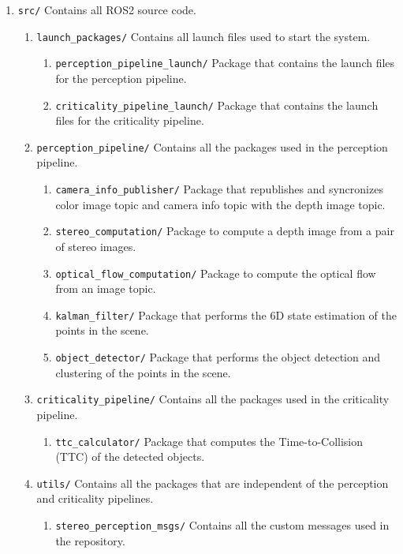 \begin{enumerate}
  \item \texttt{src/} Contains all ROS2 source code.
  \begin{enumerate}
    \item \texttt{launch\_packages/} Contains all launch files used to start the system.
    \begin{enumerate}
      \item \texttt{perception\_pipeline\_launch/} Package that contains the launch files for the perception pipeline.
      \item \texttt{criticality\_pipeline\_launch/} Package that contains the launch files for the criticality pipeline.
    \end{enumerate}
    \item \texttt{perception\_pipeline/} Contains all the packages used in the perception pipeline.
    \begin{enumerate}
      \item \texttt{camera\_info\_publisher/} Package that republishes and syncronizes color image topic and camera info topic with the depth image topic.
      \item \texttt{stereo\_computation/} Package to compute a depth image from a pair of stereo images.
      \item \texttt{optical\_flow\_computation/} Package to compute the optical flow from an image topic.
      \item \texttt{kalman\_filter/} Package that performs the 6D state estimation of the points in the scene.
      \item \texttt{object\_detector/} Package that performs the object detection and clustering of the points in the scene.
    \end{enumerate}
    \item \texttt{criticality\_pipeline/} Contains all the packages used in the criticality pipeline.
    \begin{enumerate}
      \item \texttt{ttc\_calculator/} Package that computes the Time-to-Collision (TTC) of the detected objects.
    \end{enumerate}
    \item \texttt{utils/} Contains all the packages that are independent of the perception and criticality pipelines.
    \begin{enumerate}
      \item \texttt{stereo\_perception\_msgs/} Contains all the custom messages used in the repository.

\end{enumerate}
\end{enumerate}
\end{enumerate}
